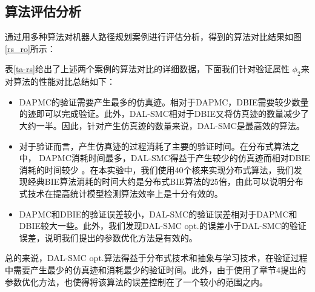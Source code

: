 \subsection{算法评估分析}
通过用多种算法对机器人路径规划案例进行评估分析，得到的算法对比结果如图 \ref{rs_ro}所示：
\begin{figure}[htbp]

\end{figure}

表\ref{ta-rs}给出了上述两个案例的算法对比的详细数据，下面我们针对验证属性 $\phi_2$来对算法的性能对比总结如下：
\begin{itemize}
\item
DAPMC的验证需要产生最多的仿真迹。相对于DAPMC，DBIE需要较少数量的迹即可以完成验证。此外，DAL-SMC相对于DBIE又将仿真迹的数量减少了大约一半。因此，针对产生仿真迹的数量来说，DAL-SMC是最高效的算法。
\item
对于验证而言，产生仿真迹的过程消耗了主要的验证时间。在分布式算法之中， DAPMC消耗时间最多，DAL-SMC得益于产生较少的仿真迹而相对DBIE消耗的时间较少 。在本实验中，我们使用40个核来实现分布式算法，我们发现经典BIE算法消耗的时间大约是分布式BIE算法的25倍，由此可以说明分布式技术在提高统计模型检测算法效率上是十分有效的。
\item
DAPMC和DBIE的验证误差较小，DAL-SMC的验证误差相对于DAPMC和DBIE较大一些。此外，我们发现DAL-SMC opt.的误差小于DAL-SMC的验证误差，说明我们提出的参数优化方法是有效的。
\end{itemize}
总的来说，DAL-SMC opt.算法得益于分布式技术和抽象与学习技术，在验证过程中需要产生最少的仿真迹和消耗最少的验证时间。此外，由于使用了章节4提出的参数优化方法，也使得将该算法的误差控制在了一个较小的范围之内。

